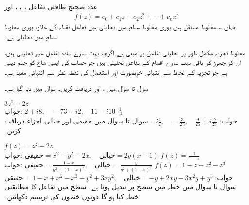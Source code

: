 \quad {}\\
عدد صحیح طاقتی تفاعل ، ، ،   اور 
\begin{align*}
f(z)=c_0+c_1z+c_2z^2+\cdots+c_nz^n
\end{align*}
جہاں ،،  مخلوط مستقل ہیں پوری مخلوط سطح میں تحلیلی ہیں۔تفاعل  نقطہ  کے علاوہ پوری مخلوط سطح میں تحلیلی ہے۔

مخلوط تجزیہ مکمل طور پر تحلیلی تفاعل پر مبنی ہے۔اگرچہ بہت سارے سادہ تفاعل غیر تحلیلی ہیں، ان کو چھوڑ کر باقی بہت سارے اقسام کے تفاعل تحلیلی ہیں جو حساب کی ایسی شاخ کو جنم دیتی ہے جو تجزیہ کے لحاظ سے انتہائی خوبصورت اور استعمال کی نقطہ نظر سے انتہائی مفید ہے۔

 سوال  تا سوال  میں ،  اور  دریافت کریں۔ سوال میں دیا گیا ہے۔

\quad 
$3z^2+2z$\\
جواب:\quad
$2+i8,\quad -73+i2,\quad 11-i10$
\quad 
$\tfrac{1}{z^2}$\\
جواب:\quad
$-i\tfrac{3}{2},\quad -\tfrac{3}{25},\quad \tfrac{9}{25}+i\tfrac{12}{25}$
سوال  تا سوال  میں حقیقی اور خیالی اجزاء دریافت کریں۔

\quad
$f(z)=z^2-2z$\\
جواب:\quad
$\text{حقیقی}=x^2-y^2-2x,\quad \text{خیالی}=2y(x-1)$
\quad
$f(z)=\tfrac{1}{1-z}$\\
جواب:\quad
$\text{حقیقی}=\tfrac{1-x}{y^2+(1-x)^2},\quad \text{خیالی}=\tfrac{y}{y^2+(1-x)^2}$
\quad
$f(z)=1-z+z^2-z^3$\\
جواب:\quad
$\text{حقیقی}= 1-x+x^2-x^3-y^2+3xy^2,\quad \text{خیالی}=-y+2xy-3x^2y+y^3$
سوال  تا سوال  میں  خطہ  میں  سطح پر تبدیل ہوتا ہے۔ سطح میں  تفاعل  کا مطابقتی خطہ کیا ہو گا۔دونوں خطوں کی ترسیم دکھائیں۔


